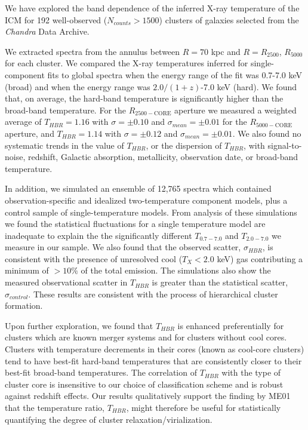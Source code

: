 \documentclass[12pt,preprint]{aastex}
\begin{document}
We have explored the band dependence of the inferred X-ray temperature
of the ICM for 192 well-observed ($N_{counts} > 1500$) clusters of
galaxies selected from the {\it Chandra} Data Archive.

We extracted spectra from the annulus between $R=70$ kpc and
$R=R_{2500}$, $R_{5000}$ for each cluster. We compared the X-ray
temperatures inferred for single-component fits to global spectra
when the energy range of the fit was 0.7-7.0 keV (broad) and when the
energy range was $2.0/(1+z)$-7.0 keV (hard). We found that, on
average, the hard-band temperature is significantly higher than
the broad-band temperature. For the $R_{2500-\mathrm{CORE}}$ aperture
we measured a weighted average of $T_{HBR} = 1.16$ with $\sigma = \pm
0.10$ and $\sigma_{mean} = \pm 0.01$ for the $R_{5000-\mathrm{CORE}}$
aperture, and $T_{HBR} = 1.14$ with $\sigma = \pm 0.12$ and
$\sigma_{mean} = \pm 0.01$. We also found no systematic trends in the
value of $T_{HBR}$, or the dispersion of $T_{HBR}$, with
signal-to-noise, redshift, Galactic absorption, metallicity,
observation date, or broad-band temperature.

In addition, we simulated an ensemble of 12,765 spectra which
contained observation-specific and idealized two-temperature component
models, plus a control sample of single-temperature models. From
analysis of these simulations we found the statistical fluctuations
for a single temperature model are inadequate to explain the the
significantly different $T_{0.7-7.0}$ and $T_{2.0-7.0}$ we measure in
our sample. We also found that the observed scatter, $\sigma_{HBR}$,
is consistent with the presence of unresolved cool ($T_X < 2.0$ keV)
gas contributing a minimum of $>10\%$ of the total emission. The
simulations also show the measured observational scatter in $T_{HBR}$
is greater than the statistical scatter, $\sigma_{control}$. These
results are consistent with the process of hierarchical cluster
formation.

Upon further exploration, we found that $T_{HBR}$ is enhanced
preferentially for clusters which are known merger systems and for
clusters without cool cores. Clusters with temperature decrements in
their cores (known as cool-core clusters) tend to have best-fit
hard-band temperatures that are consistently closer to their
best-fit broad-band temperatures. The correlation of $T_{HBR}$ with
the type of cluster core is insensitive to our choice of
classification scheme and is robust against redshift effects. Our
results qualitatively support the finding by ME01 that the temperature
ratio, $T_{HBR}$, might therefore be useful for statistically
quantifying the degree of cluster relaxation/virialization.
\end{document}

